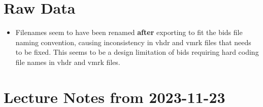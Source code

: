 \section{Raw Data}

\begin{itemize}
	\item Filenames seem to have been renamed \textbf{after} exporting to fit the bids file naming convention, causing inconsistency in vhdr and vmrk files that needs to be fixed. This seems to be a design limitation of bids requiring hard coding file names in vhdr and vmrk files. 
\end{itemize}

\section{Lecture Notes from 2023-11-23}

